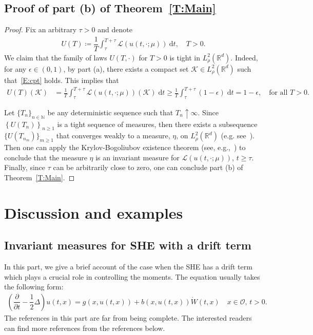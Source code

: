 \documentclass[a4paper,11pt]{article}%
\theoremstyle{plain}
\theoremstyle{definition}
\numberwithin{equation}{section}
\newcommand{\R}{\mathbb{R}}
\newcommand{\ud}{\ensuremath{\mathrm{d}}}
\begin{document}
\subsection{Proof of part (b) of Theorem~\ref{T:Main}}
\begin{proof}
  Fix an arbitrary $\tau>0$ and denote
  \begin{align*}
    U(T) \coloneqq \dfrac{1}{T}\int_{\tau}^{T+\tau} \mathcal{L}\left(u(t,\cdot;\mu)\right)\: \ud t, \quad T>0.
  \end{align*}
  We claim that the family of laws $U(T,\cdot)$ for $T > 0$ is tight in $L^2_{\rho}(\R^d)$. Indeed,
  for any $\epsilon\in (0,1)$, by part (a), there exists a compact set $\mathcal{K}\in L_\rho^2
  (\R^d)$ such that~\eqref{E:cpt} holds. This implies that
  \begin{align*}
    U(T)\left(\mathcal{K}\right)
    & = \frac{1}{T} \int_{\tau}^{T + \tau} \mathscr{L}(u(t,\cdot;\mu))\left(\mathcal{K}\right) \; \ud t
      \ge \frac{1}{T} \int_{\tau}^{T + \tau} (1-\epsilon) \; \ud t
      = 1-\epsilon, \quad \text{for all $T>0$}.
  \end{align*}

  Let $\{T_n\}_{n\in \mathbb{N}}$ be any deterministic sequence such that $T_n\uparrow \infty$.
  Since $\left\{U(T_n)\right\}_{n\ge 1}$ is a tight sequence of measures, then there exists a
  subsequence $\{U\left(T_{n_m}\right)\}_{m\ge 1}$ that converges weakly to a measure, $\eta$, on
  $L_\rho^2 (\R^d)$ (e.g. see~\cite[Theorem 5.1]{billingsley:99:convergence}). Then one can apply
  the Krylov-Bogoliubov existence theorem (see, e.g.,~\cite[Theorem
  11.7]{da-prato.zabczyk:14:stochastic}) to conclude that the measure $\eta$ is an invariant measure
  for $\mathscr{L}(u(t,\cdot;\mu))$, $t\ge \tau$. Finally, since $\tau$ can be arbitrarily close to
  zero, one can conclude part (b) of Theorem~\ref{T:Main}.
\end{proof}

\section{Discussion and examples}\label{S:Example}
\subsection{Invariant measures for SHE with a drift term}\label{SS:Drift}

In this part, we give a brief account of the case when the SHE has a drift term which plays a
crucial role in controlling the moments. The equation usually takes the following form:
\begin{align}\label{E:Drift}
  \left(\dfrac{\partial}{\partial t}-\dfrac{1}{2}\Delta\right) u(t,x)
   = g(x,u(t,x)) + b(x,u(t,x)) \dot W(t,x) \quad \text{$x\in \mathcal{O}$, $t>0$}.
\end{align}
The references in this part are far from being complete. The interested readers can find more
references from the references below.
\end{document}
